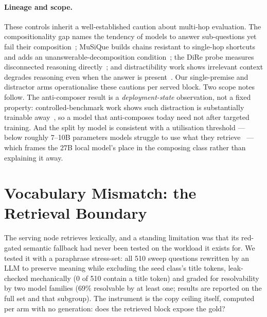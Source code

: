 \documentclass[10pt,twocolumn]{article}
\begin{document}
\paragraph{Lineage and scope.} These controls inherit a well-established caution about multi-hop evaluation. The compositionality gap names the tendency of models to answer sub-questions yet fail their composition~\cite{press2023compgap}; MuSiQue builds chains resistant to single-hop shortcuts and adds an unanswerable-decomposition condition~\cite{musique2022}; the DiRe probe measures disconnected reasoning directly~\cite{dire2020}; and distractibility work shows irrelevant context degrades reasoning even when the answer is present~\cite{shi2023distracted,faithfate2023}. Our single-premise and distractor arms operationalise these cautions per served block. Two scope notes follow. The anti-composer result is a \emph{deployment-state} observation, not a fixed property: controlled-benchmark work shows such distraction is substantially trainable away~\cite{gsmdc2025}, so a model that anti-composes today need not after targeted training. And the split by model is consistent with a utilisation threshold --- below roughly 7--10B parameters models struggle to use what they retrieve~\cite{retrievalutil2026} --- which frames the 27B local model's place in the composing class rather than explaining it away.




\section{Vocabulary Mismatch: the Retrieval Boundary}\label{sec:paraphrase}
The serving node retrieves lexically, and a standing limitation was that its red-gated semantic
fallback had never been tested on the workload it exists for. We tested it with a paraphrase
stress-set: all 510 sweep questions rewritten by an LLM to preserve meaning while excluding the
seed class's title tokens, leak-checked mechanically (0 of 510 contain a title token) and graded
for resolvability by two model families (69\% resolvable by at least one; results are reported
on the full set and that subgroup). The instrument is the copy ceiling itself, computed per arm
with no generation: does the retrieved block expose the gold?
\end{document}
